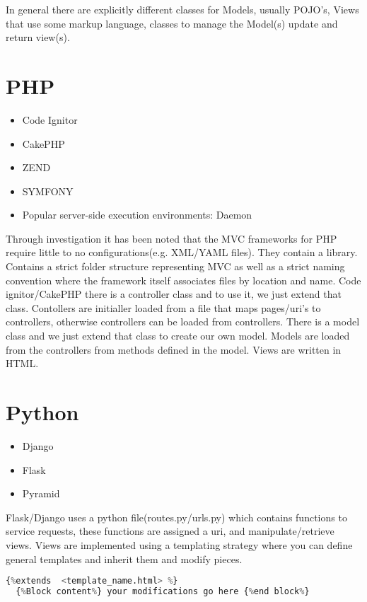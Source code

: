 In general there are explicitly different classes for Models, usually POJO's, Views that use some markup language,
classes to manage the Model(s) update and return view(s).

\section{PHP}

\begin{itemize}
  \item Code Ignitor
  \item CakePHP
  \item ZEND
  \item SYMFONY
  \item Popular server-side execution environments: Daemon
\end{itemize}

\par Through investigation it has been noted that the MVC frameworks for PHP require little to no configurations(e.g. XML/YAML files).
They contain a library. Contains a strict folder structure representing MVC as well as a strict naming convention where the framework itself associates files by location and name.
Code ignitor/CakePHP there is a controller class and to use it, we just extend that class. Contollers are initialler loaded from a file that maps pages/uri's to controllers,
otherwise controllers can be loaded from controllers. There is a model class and we just extend that class to create our own model.
Models are loaded from the controllers from methods defined in the model. Views are written in HTML.


\section{Python}
\begin{itemize}
  \item Django
  \item Flask
  \item Pyramid
\end{itemize}

Flask/Django uses a python file(routes.py/urls.py) which contains functions to service requests, these functions are assigned a uri, and manipulate/retrieve views.
Views are implemented using a templating strategy where you can define general templates and inherit them and modify pieces.

\begin{lstlisting}[language=Python]
  {%extends  <template_name.html> %}
  {%Block content%} your modifications go here {%end block%}
\end{lstlisting}

